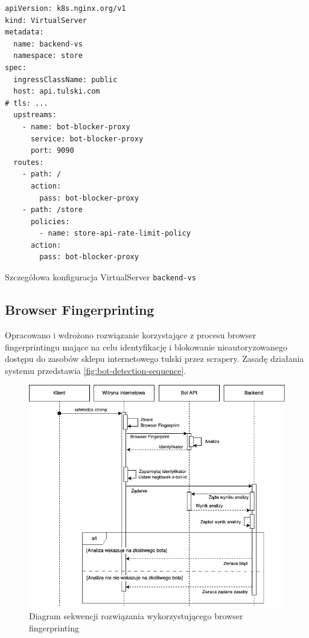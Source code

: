 \begin{listing}[p]
    \begin{verbatim}
apiVersion: k8s.nginx.org/v1
kind: VirtualServer
metadata:
  name: backend-vs
  namespace: store
spec:
  ingressClassName: public
  host: api.tulski.com
# tls: ...
  upstreams:
    - name: bot-blocker-proxy
      service: bot-blocker-proxy
      port: 9090
  routes:
    - path: /
      action:
        pass: bot-blocker-proxy
    - path: /store
      policies:
        - name: store-api-rate-limit-policy
      action:
        pass: bot-blocker-proxy
    \end{verbatim}
    \caption{Szczegółowa konfiguracja VirtualServer \texttt{backend-vs}}
    \label{lst:rate-limiting-virtual-server}
\end{listing}

\newpage

\subsection{Browser Fingerprinting}\label{subsec:browser-fingerprinting-impl}

Opracowano i wdrożono rozwiązanie korzystające z procesu browser fingerprintingu mające na celu identyfikację i blokowanie nieautoryzowanego dostępu do zasobów sklepu internetowego tulski przez scrapery.
Zasadę działania systemu przedstawia \autoref{fig:bot-detection-sequence}.

\begin{figure}[H]
    \centering
    \includegraphics[width=.95\textwidth]{img/bot-detection-sequence}
    \caption{Diagram sekwencji rozwiązania wykorzystującego browser fingerprinting}
    \label{fig:bot-detection-sequence}
\end{figure}

